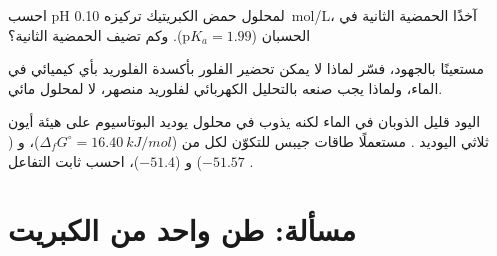 \begin{exercise}[$\star\star\star$]\label{exo:b1:p-block-16-18:10}
احسب pH لمحلول حمض الكبريتيك تركيزه \qty{0.10}{mol/L}، آخذًا الحمضية الثانية
في الحسبان ($\mathrm{p}K_a = 1.99$). وكم تضيف الحمضية
الثانية؟
\end{exercise}

\begin{exercise}[$\star\star\star$]\label{exo:b1:p-block-16-18:11}
مستعينًا بالجهود، فسّر لماذا لا يمكن تحضير الفلور بأكسدة
الفلوريد بأي  كيميائي في الماء، ولماذا يجب صنعه بالتحليل
الكهربائي لفلوريد منصهر، لا لمحلول مائي.
\end{exercise}

\begin{exercise}[$\star\star\star$]\label{exo:b1:p-block-16-18:12}
اليود قليل الذوبان في الماء لكنه يذوب في محلول يوديد البوتاسيوم
على هيئة أيون ثلاثي اليوديد . مستعملًا طاقات جيبس للتكوّن لكل من
 ($\Delta_f G^\circ = \qty{16.40}{kJ/mol}$)، و ($-51.57$)
و ($-51.4$)، احسب ثابت التفاعل .
\end{exercise}

\section{مسألة: طن واحد من الكبريت}

